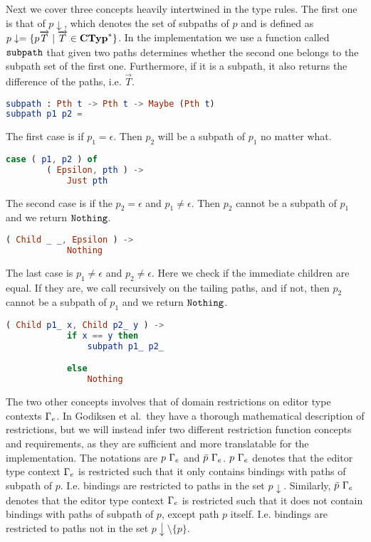 Next we cover three concepts heavily intertwined in the type rules. The first
one is that of $p\downarrow$, which denotes the set of subpaths of $p$ and is
defined as $p\downarrow = \{p \overrightarrow{T} \mid \overrightarrow{T} \in
  \textbf{CTyp}^*\}$. In the implementation we use a function called $\texttt{subpath}$ that
given two paths determines whether the second one belongs to the subpath set of
the first one. Furthermore, if it is a subpath, it also returns the difference
of the paths, i.e. $\overrightarrow{T}$.
\begin{lstlisting}[language=elm,%
           gobble=0,%
           ]
subpath : Pth t -> Pth t -> Maybe (Pth t)
subpath p1 p2 =
\end{lstlisting}
The first case is if $p_1 = \epsilon$. Then $p_2$ will be a subpath of
$p_1$ no matter what.
\begin{lstlisting}[language=elm,%
           gobble=4,%
           ]
    case ( p1, p2 ) of
        ( Epsilon, pth ) ->
            Just pth
\end{lstlisting}
The second case is if the $p_2 = \epsilon$ and $p_1 \neq \epsilon$. Then $p_2$
cannot be a subpath of $p_1$ and we return $\texttt{Nothing}$.
\begin{lstlisting}[language=elm,%
           gobble=8,%
           ]
        ( Child _ _, Epsilon ) ->
            Nothing
\end{lstlisting}
The last case is $p_1 \neq \epsilon$ and $p_2 \neq \epsilon$. Here we check if
the immediate children are equal. If they are, we call recursively on the
tailing paths, and if not, then $p_2$ cannot be a subpath of $p_1$ and we
return $\texttt{Nothing}$.
\begin{lstlisting}[language=elm,%
           gobble=8,%
           ]
        ( Child p1_ x, Child p2_ y ) ->
            if x == y then
                subpath p1_ p2_

            else
                Nothing
\end{lstlisting}

The two other concepts involves that of domain restrictions on editor type
contexts $\Gamma_{e}$. In Godiksen et al.\pepm~they have a thorough mathematical
description of restrictions, but we will instead infer two different
restriction function concepts and requirements, as they are sufficient and more
translatable for the implementation. The notations are $p~\Gamma_{e}$ and
$\bar{p}~\Gamma_{e}$. $p~\Gamma_{e}$ denotes that the editor type context $\Gamma_{e}$
is restricted such that it only contains bindings with paths of subpath of $p$.
I.e. bindings are restricted to paths in the set $p\downarrow$. Similarly,
$\bar{p}~\Gamma_{e}$ denotes that the editor type context $\Gamma_{e}$ is restricted
such that it does not contain bindings with paths of subpath of $p$, except
path $p$ itself. I.e. bindings are restricted to paths not in the set
$p\downarrow\setminus \{p\}$.

